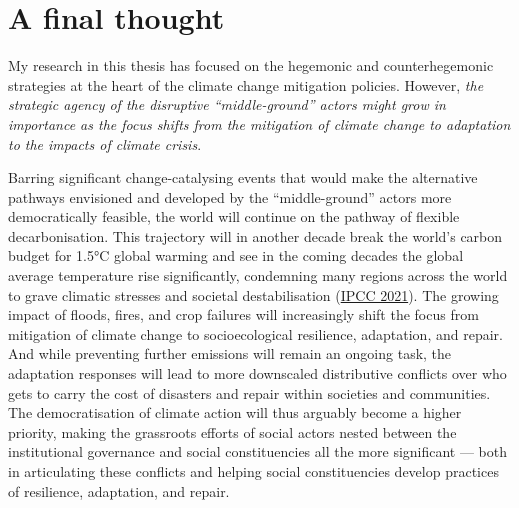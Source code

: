 \documentclass[a4paper, nobind]{templates/ociamthesis}
\begin{document}
\hypertarget{a-final-thought}{%
\section{A final thought}\label{a-final-thought}}

My research in this thesis has focused on the hegemonic and counterhegemonic strategies at the heart of the climate change mitigation policies. However, \emph{the strategic agency of the disruptive ``middle-ground'' actors might grow in importance as the focus shifts from the mitigation of climate change to adaptation to the impacts of climate crisis}.

Barring significant change-catalysing events that would make the alternative pathways envisioned and developed by the ``middle-ground'' actors more democratically feasible, the world will continue on the pathway of flexible decarbonisation. This trajectory will in another decade break the world's carbon budget for 1.5°C global warming and see in the coming decades the global average temperature rise significantly, condemning many regions across the world to grave climatic stresses and societal destabilisation (\protect\hyperlink{ref-ipcc_summary_2021}{IPCC 2021}). The growing impact of floods, fires, and crop failures will increasingly shift the focus from mitigation of climate change to socioecological resilience, adaptation, and repair. And while preventing further emissions will remain an ongoing task, the adaptation responses will lead to more downscaled distributive conflicts over who gets to carry the cost of disasters and repair within societies and communities. The democratisation of climate action will thus arguably become a higher priority, making the grassroots efforts of social actors nested between the institutional governance and social constituencies all the more significant --- both in articulating these conflicts and helping social constituencies develop practices of resilience, adaptation, and repair.
\end{document}
